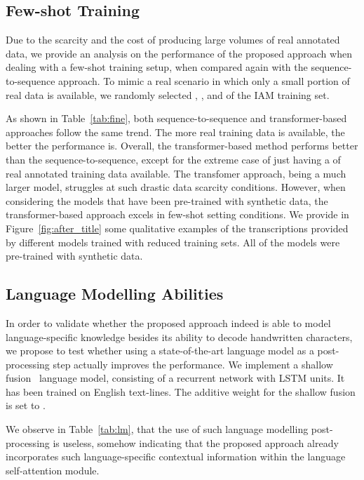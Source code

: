 \documentclass[10pt,twocolumn,letterpaper]{article}
\begin{document}
\subsection{Few-shot Training}
Due to the scarcity and the cost of producing large volumes of real annotated data, we provide an analysis on the performance of the proposed approach when dealing with a few-shot training setup, when compared again with the sequence-to-sequence approach. To mimic a real scenario in which only a small portion of real data is available, we randomly selected , ,  and  of the IAM training set.




As shown in Table~\ref{tab:fine}, both sequence-to-sequence and transformer-based approaches follow the same trend. The more real training data is available, the better the performance is. Overall, the transformer-based method performs better than the sequence-to-sequence, except for the extreme case of just having a  of real annotated training data available. The transfomer approach, being a much larger model, struggles at such drastic data scarcity conditions. However, when considering the models that have been pre-trained with synthetic data, the transformer-based approach excels in few-shot setting conditions. We provide in Figure~\ref{fig:after_title} some qualitative examples of the transcriptions provided by different models trained with reduced training sets. All of the models were pre-trained with synthetic data.







\subsection{Language Modelling Abilities}
In order to validate whether the proposed approach indeed is able to model language-specific knowledge besides its ability to decode handwritten characters, we propose to test whether using a state-of-the-art language model as a post-processing step actually improves the performance. We implement a shallow fusion~\cite{gulcehre2015using} language model, consisting of a recurrent network with  LSTM units. It has been trained on  English text-lines. The additive weight for the shallow fusion is set to .

We observe in Table~\ref{tab:lm}, that the use of such language modelling post-processing is useless, somehow indicating that the proposed approach already incorporates such language-specific contextual information within the language self-attention module.
\end{document}

